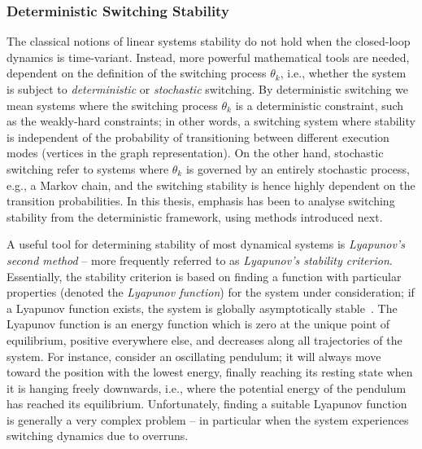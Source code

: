 \subsubsection*{Deterministic Switching Stability}%
%
The classical notions of linear systems stability do not hold when the closed-loop dynamics is time-variant.
Instead, more powerful mathematical tools are needed, dependent on the definition of the switching process $\theta_k$, i.e., whether the system is subject to \emph{deterministic} or \emph{stochastic} switching.
By deterministic switching we mean systems where the switching process $\theta_k$ is a deterministic constraint, such as the weakly-hard constraints; in other words, a switching system where stability is independent of the probability of transitioning between different execution modes (vertices in the graph representation).
On the other hand, stochastic switching refer to systems where $\theta_k$ is governed by an entirely stochastic process, e.g., a Markov chain, and the switching stability is hence highly dependent on the transition probabilities.
In this thesis, emphasis has been to analyse switching stability from the deterministic framework, using methods introduced next.

A useful tool for determining stability of most dynamical systems is \emph{Lyapunov's second method} -- more frequently referred to as \emph{Lyapunov's stability criterion}.
Essentially, the stability criterion is based on finding a function with particular properties (denoted the \emph{Lyapunov function}) for the system under consideration; if a Lyapunov function exists, the system is globally asymptotically stable~\cite{Astrom:1997}.
The Lyapunov function is an energy function which is zero at the unique point of equilibrium, positive everywhere else, and decreases along all trajectories of the system.
For instance, consider an oscillating pendulum; it will always move toward the position with the lowest energy, finally reaching its resting state when it is hanging freely downwards, i.e., where the potential energy of the pendulum has reached its equilibrium.
Unfortunately, finding a suitable Lyapunov function is generally a very complex problem -- in particular when the system experiences switching dynamics due to overruns.

